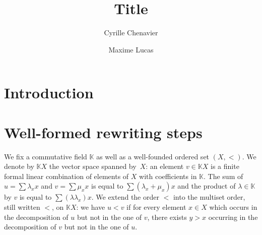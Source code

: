 \documentclass[10pt]{easychair}
\theoremstyle{definition}
\newcommand\K{\mathbb{K}}
\newcommand\KX{\K X}
\begin{document}
\title{Title}

\author{
Cyrille Chenavier
\and
Maxime Lucas
}



\maketitle

\begin{abstract}

  
\end{abstract}
 
\section{Introduction}

\section{Well-formed rewriting steps}

We fix a commutative field $\K$ as well as a well-founded ordered set
$(X,<)$. We denote by $\KX$ the vector space spanned by~$X$: an element
$v\in\KX$ is a finite formal linear combination of elements of $X$ with
coefficients in $\K$. The sum of $u=\sum\lambda_xx$ and $v=\sum\mu_xx$ is
equal to $\sum(\lambda_x+\mu_x)x$ and the product of $\lambda\in\K$ by
$v$ is equal to $\sum(\lambda\lambda_x)x$. We extend the order $<$ into
the multiset order, still written $<$, on $\KX$: we have $u<v$ if for
every element $x\in X$ which occurs in the decomposition of $u$ but not
in the one of $v$, there exists $y>x$ occurring in the decomposition of
$v$ but not in the one of $u$.

\medskip
\end{document}
